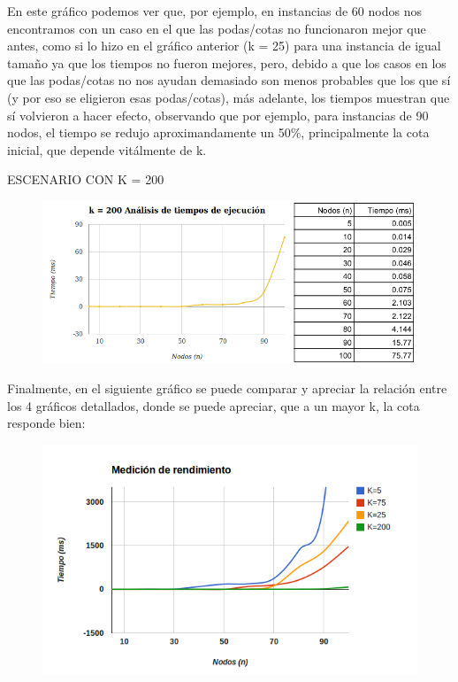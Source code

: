 En este gráfico podemos ver que, por ejemplo, en instancias de 60 nodos nos encontramos con un caso en el que las podas/cotas no funcionaron mejor que antes, como si lo hizo en el gráfico anterior (k = 25) para una instancia de igual tamaño ya que los tiempos no fueron mejores, pero, debido a que los casos en los que las podas/cotas no nos ayudan demasiado son menos probables que los que sí (y por eso se eligieron esas podas/cotas), más adelante, los tiempos muestran que sí volvieron a hacer efecto, observando que por ejemplo, para instancias de 90 nodos, el tiempo se redujo aproximandamente un 50\%, principalmente la cota inicial, que depende vitálmente de k.

\newpage \indent ESCENARIO CON K = 200
	\begin{figure}[h]
		\begin{center}
		   \includegraphics[scale=0.80]{ejercicio2/k200.png}
		\end{center}
	\end{figure}


Finalmente, en el siguiente gráfico se puede comparar y apreciar la relación entre los 4 gráficos detallados, donde se puede apreciar, que a un mayor k, la cota responde bien:

	\begin{figure}[h]
		\begin{center}
		   \includegraphics[scale=0.80]{ejercicio2/todasK.png}
		\end{center}
	\end{figure}

